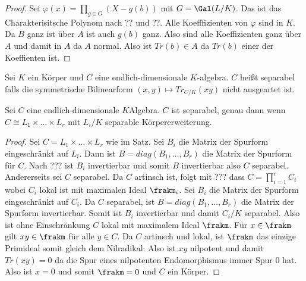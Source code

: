 \begin{proof}
	Sei \(\varphi(x)=\prod_{g\in G}(X-g(b))\) mit \(G=\Gal(L/K)\). Das ist das Charakterisitsche Polynom nach ?? und ??.
	Alle Koefffizienten von \(\varphi\) sind in \(K\). Da \(B\) ganz ist über \(A\) ist auch \(g(b)\) ganz.
	Also sind alle Koeffizienten ganz über \(A\) und damit in \(A\) da \(A\) normal.
	Also ist \(Tr(b)\in A\) da \(Tr(b)\) einer der Koeffienten ist.
\end{proof}
\begin{Def}
	Sei \(K\) ein Körper und \(C\) eine endlich-dimensionale \(K\)-algebra. \(C\) heißt separabel falls die symmetrische Bilinearform \((x,y)\mapsto Tr_{C/K}(xy)\) nicht ausgeartet ist.
\end{Def}
\begin{Lemma}
	Sei \(C\) eine endlich-dimensionale \(K\)Algebra.
	\(C\) ist separabel, genau dann wenn \(C\cong L_1\times\dots\times L_r\) mit \(L_i/K\) separable Körpererweiterung.
\end{Lemma}
\begin{proof}
	Sei \(C=L_1\times\dots\times L_r\) wie im Satz.
	Sei \(B_i\) die Matrix der Spurform eingeschränkt auf \(L_i\).
	Dann ist \(B=diag(B_1,\dots,B_r)\) die Matrix der Spurform für \(C\).
	Nach ??? ist \(B_i\) invertierbar und somit \(B\) invertierbar also \(C\) separabel.
	Andererseits sei \(C\) separabel.
	Da \(C\) artinsch ist, folgt mit ??? dass 
	\(C=\prod_{i=1}^rC_i\) wobei \(C_i\) lokal ist mit maximalen Ideal \(\frakm_i\).
	Sei \(B_i\) die Matrix der Spurform eingeschränkt auf \(C_i\).
	Da \(C\) separabel, ist \(B=diag(B_1,\dots,B_r)\) die Matrix der Spurform invertierbar. Somit ist \(B_i\) invertierbar und damit \(C_i/K\) separabel.
	Also ist ohne Einschränkung \(C\) lokal mit maximalem Ideal \(\frakm\).
	Für \(x\in\frakm\) gilt \(xy\in \frakm\) für alle \(y\in C\). Da \(C\) artinsch und lokal, ist \(\frakm\) das einzige Primideal somit gleich dem Nilradikal.
	Also ist \(xy\) nilpotent und damit \(Tr(xy)=0\) da die Spur eines nilpotenten Endomorphismus immer Spur 0 hat.
	Also ist \(x=0\) und somit \(\frakm=0\) und \(C\) ein Körper.
	
\end{proof}

